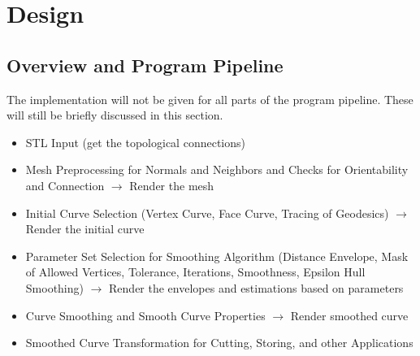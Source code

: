 \documentclass{stdlocal}
\begin{document}
\section{Design} %
\label{sec:design}

\subsection{Overview and Program Pipeline} %
\label{sub:program_pipeline}
  The implementation will not be given for all parts of the program pipeline.
  These will still be briefly discussed in this section.
  \begin{itemize}
    \item STL Input (get the topological connections)
    \item Mesh Preprocessing for Normals and Neighbors and Checks for Orientability and Connection $\rightarrow$ Render the mesh
    \item Initial Curve Selection (Vertex Curve, Face Curve, Tracing of Geodesics) $\rightarrow$ Render the initial curve
    \item Parameter Set Selection for Smoothing Algorithm (Distance Envelope, Mask of Allowed Vertices, Tolerance, Iterations, Smoothness, Epsilon Hull Smoothing) $\rightarrow$ Render the envelopes and estimations based on parameters
    \item Curve Smoothing and Smooth Curve Properties $\rightarrow$ Render smoothed curve
    \item Smoothed Curve Transformation for Cutting, Storing, and other Applications
  \end{itemize}
\end{document}

